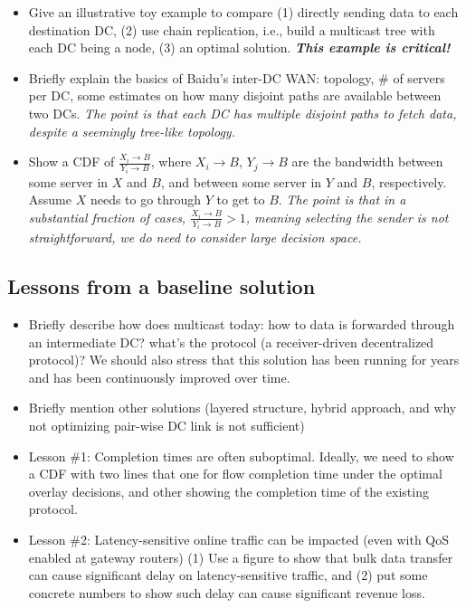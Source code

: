 \begin{itemize}

\item Give an illustrative toy example to compare (1) directly sending data to each destination DC, (2) use chain replication, i.e., build a multicast tree with each DC being a node, (3) an optimal solution.
{\em\bf This example is critical!}

\item Briefly explain the basics of Baidu's inter-DC WAN: topology, \# of servers per DC, some estimates on how many disjoint paths are available between two DCs.
{\em The point is that each DC has multiple disjoint paths to fetch data, despite a seemingly tree-like topology.}

\item Show a CDF of $\frac{X_i\rightarrow B}{Y_i\rightarrow B}$, where $X_i\rightarrow B$, $Y_j\rightarrow B$ are the bandwidth between some server in $X$ and $B$, and between some server in $Y$ and $B$, respectively. Assume $X$ needs to go through $Y$ to get to $B$.
{\em The point is that in a substantial fraction of cases, $\frac{X_i\rightarrow B}{Y_i\rightarrow B}>1$, meaning selecting the sender is not straightforward, we do need to consider large decision space.}

\end{itemize}

\subsection{Lessons from a baseline solution}
\label{subsec:motivation:baseline}
\begin{itemize}

\item Briefly describe how \company does multicast today: how to data is forwarded through an intermediate DC? what's the protocol (a receiver-driven decentralized protocol)?
We should also stress that this solution has been running for \fillme years and has been continuously improved over time.

\item Briefly mention other solutions (layered structure, hybrid approach, and why not optimizing pair-wise DC link is not sufficient)

\item Lesson \#1: Completion times are often suboptimal.
Ideally, we need to show a CDF with two lines that one for flow completion time under the optimal overlay decisions, and other showing the completion time of the existing protocol.

\item Lesson \#2: Latency-sensitive online traffic can be impacted (even with QoS enabled at gateway routers)
(1) Use a figure to show that bulk data transfer can cause significant delay on latency-sensitive traffic, and (2) put some concrete numbers to show such delay can cause significant revenue loss.

\end{itemize}

